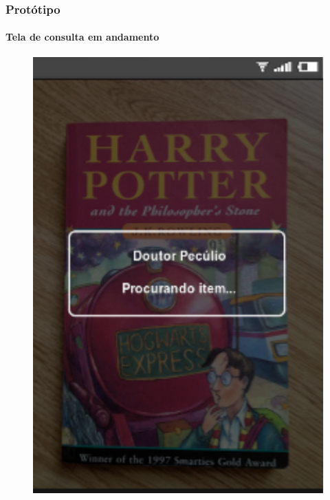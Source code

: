 \documentclass[14pt,beamer]{beamer}
\begin{document}
\begin{frame}
	\frametitle{Protótipo}
	\framesubtitle{Tela de consulta em andamento}

    \vspace{-5px}
    \begin{figure}
        \centering
        \includegraphics[scale=.71]{tela/TelaBuscando}
    \end{figure}
\end{frame}
\end{document}
